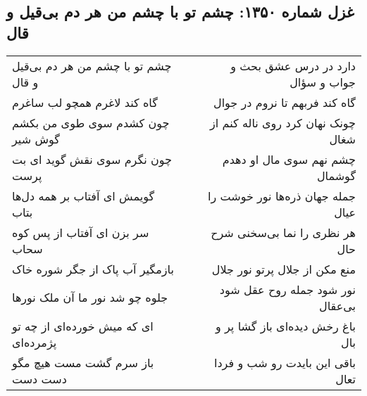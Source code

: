 \begin{center}
\section*{غزل شماره ۱۳۵۰: چشم تو با چشم من هر دم بی‌قیل و قال}
\label{sec:1350}
\begin{longtable}{l p{0.5cm} r}
چشم تو با چشم من هر دم بی‌قیل و قال
&&
دارد در درس عشق بحث و جواب و سؤال
\\
گاه کند لاغرم همچو لب ساغرم
&&
گاه کند فربهم تا نروم در جوال
\\
چون کشدم سوی طوی من بکشم گوش شیر
&&
چونک نهان کرد روی ناله کنم از شغال
\\
چون نگرم سوی نقش گوید ای بت پرست
&&
چشم نهم سوی مال او دهدم گوشمال
\\
گویمش ای آفتاب بر همه دل‌ها بتاب
&&
جمله جهان ذره‌ها نور خوشت را عیال
\\
سر بزن ای آفتاب از پس کوه سحاب
&&
هر نظری را نما بی‌سخنی شرح حال
\\
بازمگیر آب پاک از جگر شوره خاک
&&
منع مکن از جلال پرتو نور جلال
\\
جلوه چو شد نور ما آن ملک نورها
&&
نور شود جمله روح عقل شود بی‌عقال
\\
ای که میش خورده‌ای از چه تو پژمرده‌ای
&&
باغ رخش دیده‌ای باز گشا پر و بال
\\
باز سرم گشت مست هیچ مگو دست دست
&&
باقی این بایدت رو شب و فردا تعال
\\
\end{longtable}
\end{center}
